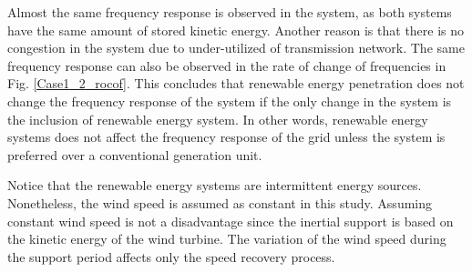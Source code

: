 Almost the same frequency response is observed in the system, as both systems have the same amount of stored kinetic energy. Another reason is that there is no congestion in the system due to under-utilized of transmission network. The same frequency response can also be observed in the rate of change of frequencies in Fig. \ref{Case1_2_rocof}. This concludes that renewable energy penetration does not change the frequency response of the system if the only change in the system is the inclusion of renewable energy system. In other words, renewable energy systems does not affect the frequency response of the grid unless the system is preferred over a conventional generation unit. \par
Notice that the renewable energy systems are intermittent energy sources. Nonetheless, the wind speed is assumed as constant in this study. Assuming constant wind speed is not a disadvantage since the inertial support is based on the kinetic energy of the wind turbine. The variation of the wind speed during the support period affects only the speed recovery process. 

